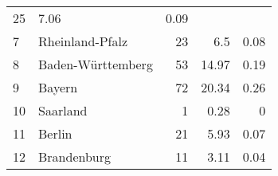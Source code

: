 \begin{longtable}{lXrrr}
       \num{25} &
       \num[round-mode=places,round-precision=2]{7,06} &
         \num[round-mode=places,round-precision=2]{0,09} \\

     7 &
     \multicolumn{1}{X}{ Rheinland-Pfalz   } &


       \num{23} &
       \num[round-mode=places,round-precision=2]{6,5} &
         \num[round-mode=places,round-precision=2]{0,08} \\

     8 &
     \multicolumn{1}{X}{ Baden-Württemberg   } &


       \num{53} &
       \num[round-mode=places,round-precision=2]{14,97} &
         \num[round-mode=places,round-precision=2]{0,19} \\

     9 &
     \multicolumn{1}{X}{ Bayern   } &


       \num{72} &
       \num[round-mode=places,round-precision=2]{20,34} &
         \num[round-mode=places,round-precision=2]{0,26} \\

     10 &
     \multicolumn{1}{X}{ Saarland   } &


       \num{1} &
       \num[round-mode=places,round-precision=2]{0,28} &
         \num[round-mode=places,round-precision=2]{0} \\

     11 &
     \multicolumn{1}{X}{ Berlin   } &


       \num{21} &
       \num[round-mode=places,round-precision=2]{5,93} &
         \num[round-mode=places,round-precision=2]{0,07} \\

     12 &
     \multicolumn{1}{X}{ Brandenburg   } &


       \num{11} &
       \num[round-mode=places,round-precision=2]{3,11} &
         \num[round-mode=places,round-precision=2]{0,04} \\


\end{longtable}
